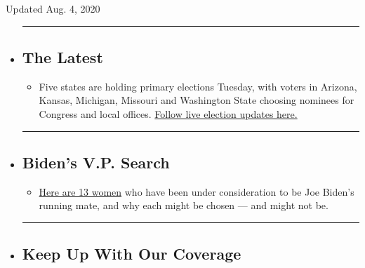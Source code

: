 Updated Aug. 4, 2020

\begin{itemize}
\item
  \begin{center}\rule{0.5\linewidth}{\linethickness}\end{center}

  \hypertarget{the-latest}{%
  \subsection{The Latest}\label{the-latest}}

  \begin{itemize}
  \tightlist
  \item
    Five states are holding primary elections Tuesday, with voters in
    Arizona, Kansas, Michigan, Missouri and Washington State choosing
    nominees for Congress and local offices.
    \href{https://www.nytimes.com/2020/08/04/us/elections/primary-election-michigan-arizona-kansas.html?action=click\&pgtype=Article\&state=default\&region=BELOW_MAIN_CONTENT\&context=storylines_guide}{Follow
    live election updates here.}
  \end{itemize}
\item
  \begin{center}\rule{0.5\linewidth}{\linethickness}\end{center}

  \hypertarget{bidens-vp-search}{%
  \subsection{Biden's V.P. Search}\label{bidens-vp-search}}

  \begin{itemize}
  \tightlist
  \item
    \href{https://www.nytimes.com/article/biden-vice-president-2020.html?action=click\&pgtype=Article\&state=default\&region=BELOW_MAIN_CONTENT\&context=storylines_guide}{Here
    are 13 women} who have been under consideration to be Joe Biden's
    running mate, and why each might be chosen --- and might not be.
  \end{itemize}
\item
  \begin{center}\rule{0.5\linewidth}{\linethickness}\end{center}

  \hypertarget{keep-up-with-our-coverage}{%
  \subsection{Keep Up With Our
  Coverage}\label{keep-up-with-our-coverage}}


\end{itemize}
